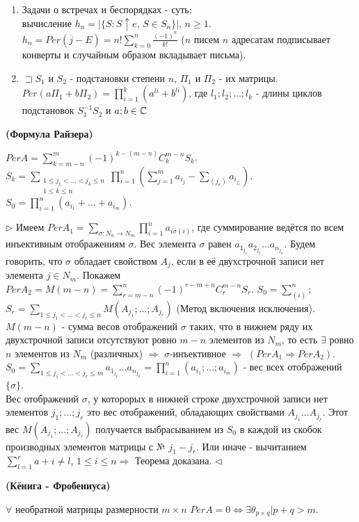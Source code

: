 \begin{enumerate}
    \item Задачи о встречах и беспорядках - суть: \\вычисление $h_n=|\{S:S\uparrow e$, $S\in S_n \}|$, $n \geq 1$. \\$h_n=Per(\overline j - E)=n! \sum\limits_{k=0}^n \frac{(-1)^n}{k!}$ ($n$ писем $n$ адресатам подписывает конверты и случайным образом вкладывает письма).
    \item $\sqsupset S_1$ и $S_2$ - подстановки степени $n$, $\Pi_1$ и $\Pi_2$ - их матрицы. \\$Per(a\Pi_1+b\Pi_2) = \prod\limits_{i=1}^k (a^{li}+b^{li})$, где $l_1;l_2;\ldots;l_k$ - длины циклов подстановок $S^{-1}_1 S_2$ и $a;b \in \mathbb{C}$
\end{enumerate}

\thr \textbf{(Формула Райзера)}

$PerA=\sum\limits_{k=m-n}^m(-1)^{k-(m-n)}C^{m-n}_k S_k$.\\$S_k=\sum\limits_{\substack{1 \leq j_1 < \ldots < j_k \leq n\\1 \leq k \leq n}} \prod\limits_{i=1}^n(\sum\limits_{j=1}^m a_{i_j} -\sum\limits_{(j_e)} a_{i_{j_e}})$. 
$S_0=\prod\limits_{i=1}^n(a_{i_1}+\ldots+a_{i_m})$.

\proof
$\rhd$ Имеем $PerA_1=\sum\limits_{\sigma:N_n \rightarrow N_m}\prod\limits_{i=1}^n a_{i\sigma(i)}$, где суммирование ведётся по всем инъективным отображениям $\sigma$. Вес элемента $\sigma$ равен $a_{1_{j_1}}a_{2_{j_2}}\ldots a_{n_{j_n}}$. Будем говорить, что $\sigma$ обладает свойством $A_j$, если в её двухстрочной записи нет элемента $j\in N_m$. 
Покажем $PerA_2=M(m-n)=\sum\limits_{r=m-n}^n (-1)^{r-m+n}C^{m-n}_r S_r$. $S_0=\sum\limits_{(i)}^n$; $S_r=\sum\limits_{1\leq j_1<\ldots<j_r\leq n}M(A_{j_1};\ldots;A_{j_r})$ (Метод включения исключения).
$M(m-n)$ - сумма весов отображений $\sigma$ таких, что в нижнем ряду их двухстрочной записи отсутствуют ровно $m-n$ элементов из $N_m$, то есть $\exists$ ровно $n$ элементов из $N_m$ (различных) $\Rightarrow$ $\sigma$-инъективное $\Rightarrow$ $(PerA_1 \Rightarrow PerA_2)$.
$S_0=\sum\limits_{1\leq j_1<\ldots<j_r\leq m}a_{1_{j_1}}\ldots a_{n_{j_n}}=\prod\limits_{i=1}^n(a_{i_1};\ldots;a_{i_m})$ - вес всех отображений $\{\sigma\}$.
\\Вес отображений $\sigma$, у которорых в нижней строке двухстрочной записи нет элементов $j_1;\ldots;j_r$ это вес отображений, обладающих свойствами $A_{j_1}\ldots A_{j_r}$. Этот вес $M(A_{j_1};\ldots;A_{j_r})$ получается выбрасыванием из $S_0$ в каждой из скобок производных элементов матрицы с № $j_1-j_r$. Или иначе - вычитанием $\sum\limits_{l=1}^r a+i\neq l$, $1\leq i\leq n \Rightarrow$ Теорема доказана. $\triangleleft$


\thr \textbf{(Кёнига - Фробениуса)}

$\forall$ необратной матрицы размерности $m\times n$ 
$PerA=0 \Leftrightarrow \exists  \theta_{p\times q}| p+q>m$.
